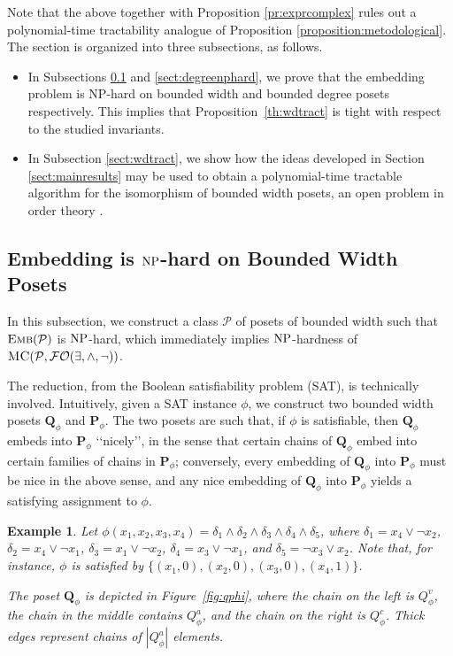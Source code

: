 \documentclass[usletter]{article}
\newcommand{\longversion}[1]{#1}
\newcommand{\shortversion}[1]{}
\newcommand{\longshort}[2]{\longversion{#1}\shortversion{#2}}
\newcommand{\pp}{\mathbf{P}}
\newcommand{\qq}{\mathbf{Q}}
\newtheorem{example}{Example}
\begin{document}
\longshort{\pfwdtract}{}

Note that the above together with Proposition \ref{pr:exprcomplex} rules out a polynomial-time tractability analogue of Proposition \ref{proposition:metodological}.
The section is organized into three subsections, as follows.
\begin{itemize}
\item In Subsections \ref{sect:widthnphard} and \ref{sect:degreenphard}, we prove that the embedding problem is NP-hard on bounded width and bounded degree posets respectively. This implies that Proposition~\ref{th:wdtract} is tight with respect to the studied invariants.
\item In Subsection \ref{sect:wdtract}, we show how the ideas developed in Section \ref{sect:mainresults} may be used to obtain a polynomial-time tractable algorithm for the isomorphism of bounded width posets, an open problem in order theory \cite[p.~284]{CaspardLeclercMonjardet12}. 
\end{itemize}


\subsection{Embedding is $\textup{NP}$-hard on Bounded Width Posets}\label{sect:widthnphard}

In this subsection, we construct a class $\mathcal{P}$ of 
posets of bounded width 
such that $\textsc{Emb}(\mathcal{P})$ is $\textup{NP}$-hard, which immediately implies 
$\textup{NP}$-hardness of $\textsc{MC}(\mathcal{P},\mathcal{FO}(\exists,\wedge,\neg))$. 

The reduction, from the Boolean satisfiability problem (SAT), is technically involved.  
Intuitively, given a SAT instance $\phi$, 
we construct two bounded width posets $\qq_\phi$ and $\pp_\phi$.  
The two posets are such that, if $\phi$ is satisfiable, 
then $\qq_\phi$ embeds into $\pp_\phi$ \lq\lq nicely\rq\rq, 
in the sense that certain chains of $\qq_\phi$ embed 
into certain families of chains in $\pp_\phi$; 
conversely, 
every embedding of $\qq_\phi$ into $\pp_\phi$ must be nice in the above sense, 
and any nice embedding of $\qq_\phi$ into $\pp_\phi$ yields a satisfying assignment to $\phi$.
\newcommand{\exexa}[0]{
\begin{example}\label{ex:ex1}
Let $\phi(x_1,x_2,x_3,x_4)=\delta_1 \wedge \delta_2 \wedge \delta_3 \wedge \delta_4 \wedge \delta_5$, 
where 
$\delta_1=x_4 \vee \neg x_2$, 
$\delta_2=x_4 \vee \neg x_1$, 
$\delta_3=x_1 \vee \neg x_2$, 
$\delta_4=x_3 \vee \neg x_1$, and 
$\delta_5=\neg x_3 \vee x_2$.  Note that, for instance, 
$\phi$ is satisfied by $\{(x_1,0),(x_2,0),(x_3,0),(x_4,1)\}$.  

The poset $\qq_{\phi}$ is depicted in Figure~\ref{fig:qphi}, 
where the chain on the left is $Q^v_{\phi}$, 
the chain in the middle contains $Q^a_{\phi}$, 
and the chain on the right is $Q^c_{\phi}$.  
Thick edges represent chains of $|Q^a_{\phi}|$ elements.
\end{example}}
\longversion{\exexa}
\end{document}
